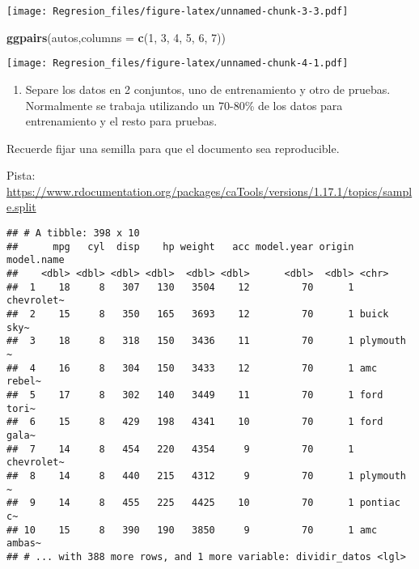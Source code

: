 \documentclass[]{article}
\newenvironment{Shaded}{\begin{snugshade}}{\end{snugshade}}
\newcommand{\CommentTok}[1]{\textcolor[rgb]{0.56,0.35,0.01}{\textit{#1}}}
\newcommand{\DataTypeTok}[1]{\textcolor[rgb]{0.13,0.29,0.53}{#1}}
\newcommand{\DecValTok}[1]{\textcolor[rgb]{0.00,0.00,0.81}{#1}}
\newcommand{\FloatTok}[1]{\textcolor[rgb]{0.00,0.00,0.81}{#1}}
\newcommand{\KeywordTok}[1]{\textcolor[rgb]{0.13,0.29,0.53}{\textbf{#1}}}
\newcommand{\NormalTok}[1]{#1}
\newcommand{\OperatorTok}[1]{\textcolor[rgb]{0.81,0.36,0.00}{\textbf{#1}}}
\newcommand{\StringTok}[1]{\textcolor[rgb]{0.31,0.60,0.02}{#1}}
\providecommand{\tightlist}{%
  \setlength{\itemsep}{0pt}\setlength{\parskip}{0pt}}
\begin{document}
\texttt{[image: Regresion\_files/figure-latex/unnamed-chunk-3-3.pdf]}

\begin{Shaded}
\begin{Highlighting}[]
\KeywordTok{ggpairs}\NormalTok{(autos,}\DataTypeTok{columns =} \KeywordTok{c}\NormalTok{(}\DecValTok{1}\NormalTok{, }\DecValTok{3}\NormalTok{, }\DecValTok{4}\NormalTok{, }\DecValTok{5}\NormalTok{, }\DecValTok{6}\NormalTok{, }\DecValTok{7}\NormalTok{))}
\end{Highlighting}
\end{Shaded}

\texttt{[image: Regresion\_files/figure-latex/unnamed-chunk-4-1.pdf]}

\begin{enumerate}
\def\labelenumi{\arabic{enumi}.}
\setcounter{enumi}{2}
\tightlist
\item
  Separe los datos en 2 conjuntos, uno de entrenamiento y otro de
  pruebas. Normalmente se trabaja utilizando un 70-80\% de los datos
  para entrenamiento y el resto para pruebas.
\end{enumerate}

Recuerde fijar una semilla para que el documento sea reproducible.

Pista:
\url{https://www.rdocumentation.org/packages/caTools/versions/1.17.1/topics/sample.split}

\begin{Shaded}
\end{Shaded}

\begin{verbatim}
## # A tibble: 398 x 10
##      mpg   cyl  disp    hp weight   acc model.year origin model.name
##    <dbl> <dbl> <dbl> <dbl>  <dbl> <dbl>      <dbl>  <dbl> <chr>     
##  1    18     8   307   130   3504    12         70      1 chevrolet~
##  2    15     8   350   165   3693    12         70      1 buick sky~
##  3    18     8   318   150   3436    11         70      1 plymouth ~
##  4    16     8   304   150   3433    12         70      1 amc rebel~
##  5    17     8   302   140   3449    11         70      1 ford tori~
##  6    15     8   429   198   4341    10         70      1 ford gala~
##  7    14     8   454   220   4354     9         70      1 chevrolet~
##  8    14     8   440   215   4312     9         70      1 plymouth ~
##  9    14     8   455   225   4425    10         70      1 pontiac c~
## 10    15     8   390   190   3850     9         70      1 amc ambas~
## # ... with 388 more rows, and 1 more variable: dividir_datos <lgl>
\end{verbatim}
\end{document}
